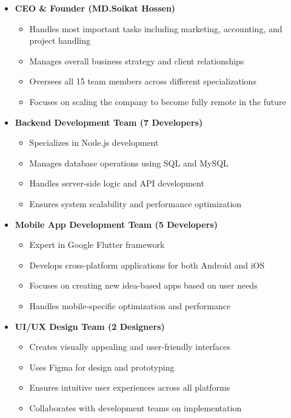 \documentclass[12pt,a4paper]{article}
\begin{document}
\begin{itemize}
    \item \textbf{CEO \& Founder (MD.Soikat Hossen)}
    \begin{itemize}
        \item Handles most important tasks including marketing, accounting, and project handling
        \item Manages overall business strategy and client relationships
        \item Oversees all 15 team members across different specializations
        \item Focuses on scaling the company to become fully remote in the future
    \end{itemize}
    
    \item \textbf{Backend Development Team (7 Developers)}
    \begin{itemize}
        \item Specializes in Node.js development
        \item Manages database operations using SQL and MySQL
        \item Handles server-side logic and API development
        \item Ensures system scalability and performance optimization
    \end{itemize}
    
    \item \textbf{Mobile App Development Team (5 Developers)}
    \begin{itemize}
        \item Expert in Google Flutter framework
        \item Develops cross-platform applications for both Android and iOS
        \item Focuses on creating new idea-based apps based on user needs
        \item Handles mobile-specific optimization and performance
    \end{itemize}
    
    \item \textbf{UI/UX Design Team (2 Designers)}
    \begin{itemize}
        \item Creates visually appealing and user-friendly interfaces
        \item Uses Figma for design and prototyping
        \item Ensures intuitive user experiences across all platforms
        \item Collaborates with development teams on implementation
    \end{itemize}
    

\end{itemize}
\end{document}
